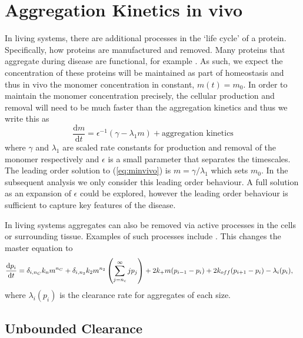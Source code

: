 \section{Aggregation Kinetics in vivo}

In living systems, there are additional processes in the `life cycle' of a protein. Specifically, how proteins are manufactured and removed. Many proteins that aggregate during disease are functional, for example . As such, we expect the concentration of these proteins will be maintained as part of homeostasis and thus in vivo the monomer concentration in constant, $m(t)=m_0$. In order to maintain the monomer concentration precisely, the cellular production and removal will need to be much faster than the aggregation kinetics and thus we write this as
\begin{equation}
    \frac{\text{d}m}{\text{d}t} = \epsilon^{-1}\left( \gamma - \lambda_1 m \right) + \text{aggregation kinetics}
    \label{eq:minvivo}
\end{equation}
where $\gamma$ and $\lambda_1$ are scaled rate constants for production and removal of the monomer respectively and $\epsilon$ is a small parameter that separates the timescales. The leading order solution to (\ref{eq:minvivo}) is $m=\gamma/\lambda_1$ which sets $m_0$. In the subsequent analysis we only consider this leading order behaviour. A full solution as an expansion of $\epsilon$ could be explored, however the leading order behaviour is sufficient to capture key features of the disease.

In living systems aggregates can also be removed via active processes in the cells or surrounding tissue. Examples of such processes include . This changes the master equation to
\begin{equation}
\begin{split}
    \frac{\text{d}p_i}{\text{d}t} &= \delta_{i, n_C}k_n m^{n_C} + \delta_{i, n_2} k_2 m^{n_2} \left(\sum_{j=n_{\mathrm{c}}}^{\infty} j p_j\right) + 2k_+ m (p_{i-1}-p_i) + 2k_{off} (p_{i+1}-p_i) - \lambda_i(p_i),
    \end{split}
    \label{eq:pi_cleared}
\end{equation}
where $\lambda_i(p_i)$ is the clearance rate for aggregates of each size.


\subsection{Unbounded Clearance}

